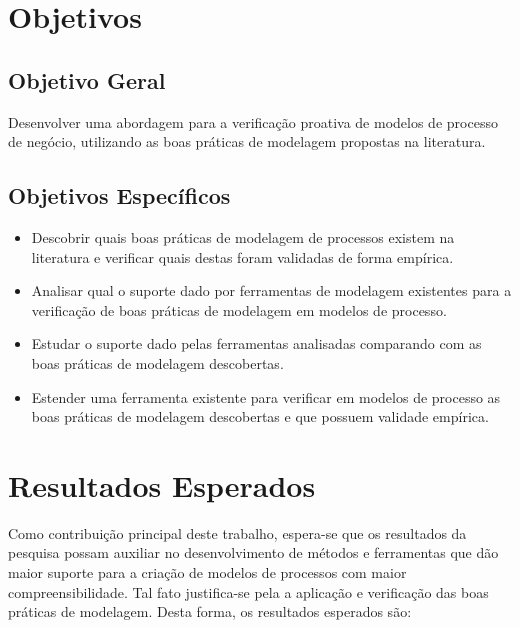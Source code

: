 \documentclass[12pt]{article}
\begin{document}
\section{Objetivos}

\subsection{Objetivo Geral}

Desenvolver uma abordagem para a verificação proativa de modelos de processo de negócio, utilizando as boas práticas de modelagem propostas na literatura.

\subsection{Objetivos Específicos}
\begin{itemize}
	\item Descobrir quais boas práticas de modelagem de processos existem na literatura e verificar quais destas foram validadas de forma empírica.
	\item Analisar qual o suporte dado por ferramentas de modelagem existentes para a verificação de boas práticas de modelagem em modelos de processo.
	\item Estudar o suporte dado pelas ferramentas analisadas comparando com as boas práticas de modelagem descobertas.
	\item Estender uma ferramenta existente para verificar em modelos de processo as boas práticas de modelagem descobertas e que possuem validade empírica.
\end{itemize}

\section{Resultados Esperados}

Como contribuição principal deste trabalho, espera-se que os resultados da pesquisa possam auxiliar no desenvolvimento de métodos e ferramentas que dão maior suporte para a criação de modelos de processos com maior compreensibilidade. Tal fato justifica-se pela a aplicação e verificação das boas práticas de modelagem. Desta forma, os resultados esperados são:
\end{document}
